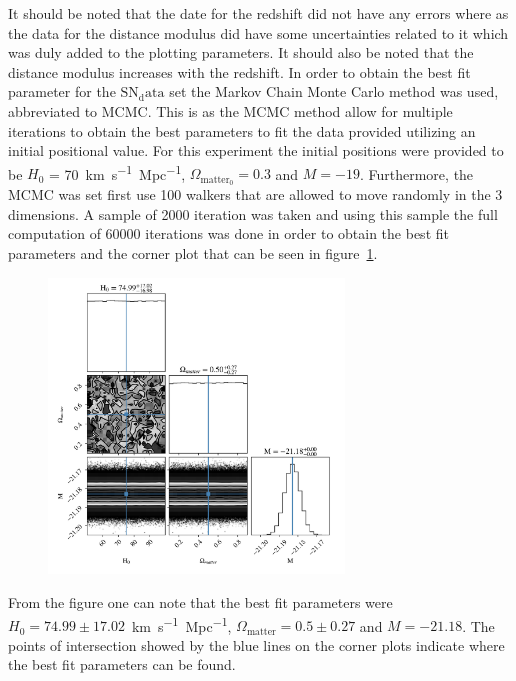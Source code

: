 \documentclass[12pt, a4paper]{article}
\begin{document}
It should be noted that the date for the redshift did not have any errors where as the data for the distance modulus did have some uncertainties related to it which was duly added to the plotting parameters. It should also be noted that the distance modulus increases with the redshift. In order to obtain the best fit parameter for the \(\mathrm{SN_data}\) set the Markov Chain Monte Carlo method was used, abbreviated to MCMC. This is as the MCMC method allow for multiple iterations to obtain the best parameters to fit the data provided utilizing an initial positional value. For this experiment the initial positions were provided to be \(H_0\) = \qty{70}{km.s^{-1}.Mpc^{-1}}, \(\Omega_{\mathrm{matter_0}} = 0.3\) and \(M=-19\). Furthermore, the MCMC was set first use 100 walkers that are allowed to move randomly in the 3 dimensions. A sample of 2000 iteration was taken and using this sample the full computation of 60000 iterations was done in order to obtain the best fit parameters and the corner plot that can be seen in figure~\ref{fig:corner~plots}. 

\begin{figure}[H]
    \centering
    \includegraphics[width = 0.7\textwidth]{Graph 4.png}
    \label{fig:corner~plots}
\end{figure}

From the figure one can note that the best fit parameters were \(H_0 = 74.99 \pm 17.02\)~\unit{km.s^{-1}.Mpc^{-1}}, \(\Omega_{\mathrm{matter}} = 0.5 \pm 0.27\) and \(M = -21.18\). The points of intersection showed by the blue lines on the corner plots indicate where the best fit parameters can be found. 
\end{document}
